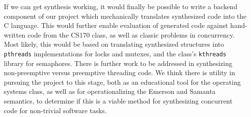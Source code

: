 If we can get synthesis working, it would finally be possible to write a backend component of our project which mechanically translates synthesized code into the C language.  This would further enable evaluation of generated code against hand-written code from the CS170 class, as well as classic problems in concurrency.  Most likely, this would be based on translating synthesized structures into \texttt{pthreads} implementations for locks and mutexes, and the class's \texttt{kthreads} library for semaphores.  There is further work to be addressed in synthesizing non-preemptive versus preemptive threading code.  We think there is utility in pursuing the project to this stage, both as an educational tool for the operating systems class, as well as for operationalizing the Emerson and Samanta semantics, to determine if this is a viable method for synthesizing concurrent code for non-trivial software tasks.
